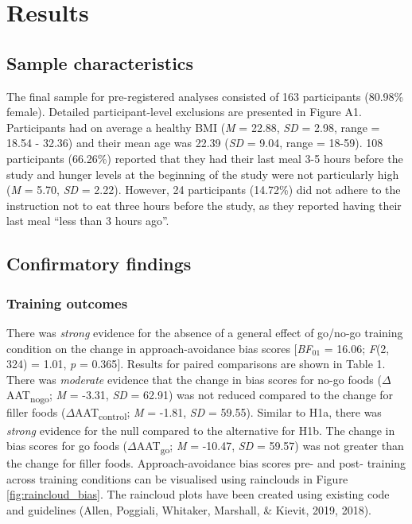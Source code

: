 \documentclass[man,floatsintext]{apa6}
\begin{document}
\hypertarget{results}{%
\section{Results}\label{results}}

\hypertarget{sample-characteristics}{%
\subsection{Sample characteristics}\label{sample-characteristics}}

The final sample for pre-registered analyses consisted of 163 participants (80.98\% female). Detailed participant-level exclusions are presented in Figure A1. Participants had on average a healthy BMI (\emph{M} = 22.88, \emph{SD} = 2.98, range = 18.54 - 32.36) and their mean age was 22.39 (\emph{SD} = 9.04, range = 18-59). 108 participants (66.26\%) reported that they had their last meal 3-5 hours before the study and hunger levels at the beginning of the study were not particularly high (\emph{M} = 5.70, \emph{SD} = 2.22). However, 24 participants (14.72\%) did not adhere to the instruction not to eat three hours before the study, as they reported having their last meal \enquote{less than 3 hours ago}.

\hypertarget{confirmatory_findings}{%
\subsection{Confirmatory findings}\label{confirmatory_findings}}

\hypertarget{training_outcomes}{%
\subsubsection{Training outcomes}\label{training_outcomes}}

\par

There was \emph{strong} evidence for the absence of a general effect of go/no-go training condition on the change in approach-avoidance bias scores {[}\emph{BF}\(_{01}\) = 16.06; \emph{F}(2, 324) = 1.01, \emph{p} = 0.365{]}. Results for paired comparisons are shown in Table 1. There was \emph{moderate} evidence that the change in bias scores for no-go foods (\(\Delta\)AAT\textsubscript{nogo}; \emph{M} = -3.31, \emph{SD} = 62.91) was not reduced compared to the change for filler foods (\(\Delta\)AAT\textsubscript{control}; \emph{M} = -1.81, \emph{SD} = 59.55). Similar to H1a, there was \emph{strong} evidence for the null compared to the alternative for H1b. The change in bias scores for go foods (\(\Delta\)AAT\textsubscript{go}; \emph{M} = -10.47, \emph{SD} = 59.57) was not greater than the change for filler foods. Approach-avoidance bias scores pre- and post- training across training conditions can be visualised using rainclouds in Figure \ref{fig:raincloud_bias}. The raincloud plots have been created using existing code and guidelines (Allen, Poggiali, Whitaker, Marshall, \& Kievit, 2019, 2018).
\end{document}
